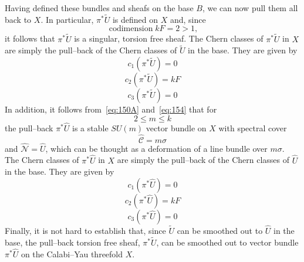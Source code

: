 \documentclass[a4paper,12pt]{article}
\numberwithin{equation}{section}
\def\cC{{\mathcal C}}
\def\cN{{\mathcal N}}
\theoremstyle{plain}
\begin{document}
Having defined these bundles and sheafs on the base $B$, we can now pull them
all back to $X$. In particular, $\pi^{*}\widetilde{U}$ is defined on $X$
and, since
\begin{equation}
\operatorname{codimension}   kF= 2 > 1,
\label{eq:171}
\end{equation}
it follows that $\pi^{*}\tilde{U}$ is a singular, torsion free sheaf.
The Chern classes of $\pi^{*}\tilde{U}$ in $X$ are simply the 
pull--back of the Chern classes of $\tilde{U}$ in the base. They are given by
\begin{equation}
c_{1}(\pi^{*}\tilde{U})=0
\label{eq:172}
\end{equation}
\begin{equation}
c_{2}(\pi^{*}\tilde{U})=kF
\label{eq:173}
\end{equation}
\begin{equation}
c_{3}(\pi^{*}\tilde{U})=0
\label{eq:174}
\end{equation}
In addition, it follows from~\eqref{eq:150A} and~\eqref{eq:154} that for
\begin{equation}
2\leq m \leq k
\label{eq:174A}
\end{equation}
the pull--back $\pi^{*}\widehat{U}$ is a stable $SU(m)$
vector bundle on $X$ with spectral cover
\begin{equation}
\hat{\cC}= m\sigma
\label{eq:175}
\end{equation}
and $\widehat{\cN}=\widehat{U}$, which can be 
thought as a deformation of a line bundle over $m\sigma$. 
The Chern classes of $\pi^{*}\hat{U}$ in $X$ are simply the 
pull--back of the
Chern classes of $\hat{U}$ in the base. They are given by
\begin{equation}
c_{1}(\pi^{*}\hat{U})=0
\label{eq:177}
\end{equation}
\begin{equation}
c_{2}(\pi^{*}\hat{U})=kF
\label{eq:178}
\end{equation}
\begin{equation}
c_{3}(\pi^{*}\hat{U})=0
\label{eq:179}
\end{equation}
Finally, it is not hard to establish that, since $\tilde{U}$ can be smoothed
out to $\hat{U}$ in the base, the pull--back torsion free
sheaf, $\pi^{*}\tilde{U}$, can be smoothed out to vector bundle
$\pi^{*}\hat{U}$ on the Calabi--Yau threefold $X$.
\end{document}
